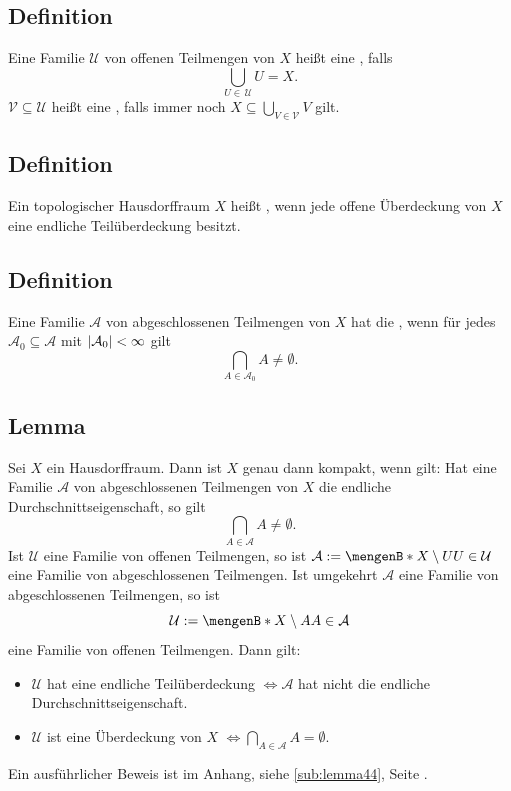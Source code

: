 \subsection[Definition: Offene Überdeckung und Teilüberdeckung]{Definition} %
\label{sub:41}
Eine Familie $\mathcal{U}$ von offenen Teilmengen von $X$ heißt eine , falls 
\[
	\bigcup_{U \in \,\mathcal{U}} U = X.
\] 
$\mathcal{V} \subseteq \mathcal{U} $ heißt eine , falls immer noch $X \subseteq \bigcup_{V \in \mathcal{V} } V$ gilt.

\subsection[Definition: Kompaktheit]{Definition} %
\label{sub:42}
Ein topologischer Hausdorffraum $X$ heißt , wenn jede offene Überdeckung von $X$ eine endliche Teilüberdeckung besitzt.

\subsection[Definition: Endliche Durchschnittseigenschaft]{Definition} %
\label{sub:43}
Eine Familie $\mathcal{A}$ von abgeschlossenen Teilmengen von $X$ hat die , wenn für jedes $\mathcal{A}_0 \subseteq \mathcal{A}$ mit
$\abs*{\mathcal{A}_0 } < \infty$ gilt 
\[
	\bigcap_{A \in \mathcal{A}_0 } A \not= \emptyset.
\]

\subsection[Lemma: Äquivalenz zur Kompaktheit eines Hausdorffraumes]{Lemma} %
\label{sub:44}
Sei $X$ ein Hausdorffraum. Dann ist $X$ genau dann kompakt, wenn gilt: Hat eine Familie $\mathcal{A}$ von abgeschlossenen Teilmengen von $X$ die endliche 
Durchschnittseigenschaft, so gilt 
\[
	\bigcap_{A \in \mathcal{A}} A \not= \emptyset.
\]
Ist $\mathcal{U}$ eine Familie von offenen Teilmengen, so ist $\mathcal{A} := \set[X \setminus U]{U \in \mathcal{U}}$ eine Familie von abgeschlossenen Teilmengen. Ist
umgekehrt $\mathcal{A}$ eine Familie von abgeschlossenen Teilmengen, so ist 
\[
	\mathcal{U} := \set[X \setminus A]{A \in \mathcal{A} } 
\]
eine Familie von offenen Teilmengen.
Dann gilt: 
\begin{itemize}
	\item $\mathcal{U}$ hat eine endliche Teilüberdeckung $\iff \mathcal{A}$ hat nicht die endliche Durchschnittseigenschaft.
	\item $\mathcal{U}$ ist eine Überdeckung von $X$ $\iff \bigcap_{A \in \mathcal{A} }A = \emptyset$. \bewende
\end{itemize}
Ein ausführlicher Beweis ist im Anhang, siehe \ref{sub:lemma44}, Seite \pageref{sub:lemma44}.

